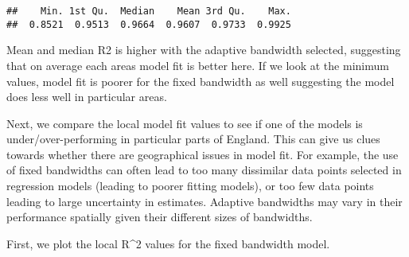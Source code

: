 \documentclass[
]{book}
\newenvironment{Shaded}{\begin{snugshade}}{\end{snugshade}}
\newcommand{\AttributeTok}[1]{\textcolor[rgb]{0.77,0.63,0.00}{#1}}
\newcommand{\CommentTok}[1]{\textcolor[rgb]{0.56,0.35,0.01}{\textit{#1}}}
\newcommand{\DecValTok}[1]{\textcolor[rgb]{0.00,0.00,0.81}{#1}}
\newcommand{\FunctionTok}[1]{\textcolor[rgb]{0.00,0.00,0.00}{#1}}
\newcommand{\NormalTok}[1]{#1}
\newcommand{\OtherTok}[1]{\textcolor[rgb]{0.56,0.35,0.01}{#1}}
\newcommand{\SpecialCharTok}[1]{\textcolor[rgb]{0.00,0.00,0.00}{#1}}
\newcommand{\StringTok}[1]{\textcolor[rgb]{0.31,0.60,0.02}{#1}}
\begin{document}
\begin{verbatim}
##    Min. 1st Qu.  Median    Mean 3rd Qu.    Max. 
##  0.8521  0.9513  0.9664  0.9607  0.9733  0.9925
\end{verbatim}

Mean and median R2 is higher with the adaptive bandwidth selected, suggesting that on average each areas model fit is better here. If we look at the minimum values, model fit is poorer for the fixed bandwidth as well suggesting the model does less well in particular areas.

Next, we compare the local model fit values to see if one of the models is under/over-performing in particular parts of England. This can give us clues towards whether there are geographical issues in model fit. For example, the use of fixed bandwidths can often lead to too many dissimilar data points selected in regression models (leading to poorer fitting models), or too few data points leading to large uncertainty in estimates. Adaptive bandwidths may vary in their performance spatially given their different sizes of bandwidths.

First, we plot the local R\^{}2 values for the fixed bandwidth model.

\begin{Shaded}
\end{Shaded}
\end{document}
